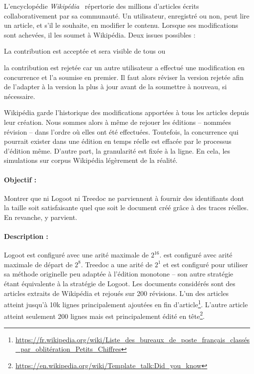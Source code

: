 L'encyclopédie \emph{Wikipédia}~\cite{wikipedia} répertorie des millions
d'articles écrits collaborativement par sa communauté. Un utilisateur,
enregistré ou non, peut lire un article, et s'il le souhaite, en modifier le
contenu. Lorsque ses modifications sont achevées, il les soumet à
Wikipédia. Deux issues possibles :
\begin{inparaenum}[(i)]
\item La contribution est acceptée et sera visible de tous ou
\item la contribution est rejetée car un autre utilisateur a effectué une
  modification en concurrence et l'a soumise en premier. Il faut alors réviser
  la version rejetée afin de l'adapter à la version la plus à jour avant de la
  soumettre à nouveau, si nécessaire.
\end{inparaenum}
Wikipédia garde l'historique des modifications apportées à tous les articles
depuis leur création. Nous sommes alors à même de rejouer les éditions --
nommées révision -- dans l'ordre où elles ont été effectuées. Toutefois, la
concurrence qui pourrait exister dans une édition en temps réelle est effacée
par le processus d'édition même. D'autre part, la granularité est fixée à la
ligne. En cela, les simulations sur corpus Wikipédia légèrement de la
réalité.


\paragraph{Objectif :} Montrer que ni Logoot ni Treedoc ne parviennent à fournir
des identifiants dont la taille soit satisfaisante quel que soit le document
créé grâce à des traces réelles. En revanche, \LSEQ y parvient.

\paragraph{Description :} Logoot est configuré avec une arité maximale de
$2^{16}$. \LSEQ est configuré avec arité maximale de départ de $2^{8}$. Treedoc
a une arité de $2^1$ et est configuré pour utiliser sa méthode originelle peu
adaptée à l'édition monotone -- son autre stratégie étant équivalente à la
stratégie de Logoot. Les documents considérés sont des articles extraits de
Wikipédia et rejoués sur 200 révisions. L'un des articles atteint jusqu'à 10k
lignes principalement ajoutées en fin
d'article\footnote{\scriptsize\url{https://fr.wikipedia.org/wiki/Liste_des_bureaux_de_poste_français_classés_par_oblitération_Petits_Chiffres}}. L'autre
article atteint seulement 200 lignes mais est principalement édité en
tête\footnote{\scriptsize\url{https://en.wikipedia.org/wiki/Template_talk:Did_you_know}}.

